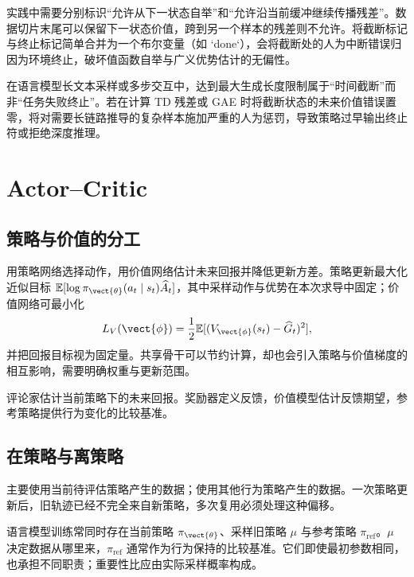 \documentclass[../textbook.tex]{subfiles}
\begin{document}
实践中需要分别标识“允许从下一状态自举”和“允许沿当前缓冲继续传播残差”。数据切片末尾可以保留下一状态价值，跨到另一个样本的残差则不允许。将截断标记与终止标记简单合并为一个布尔变量（如 `done`），会将截断处的人为中断错误归因为环境终止，破坏值函数自举与广义优势估计的无偏性。


\begin{warning}[人为截断与环境终止的混淆陷阱]
在语言模型长文本采样或多步交互中，达到最大生成长度限制属于“时间截断”而非“任务失败终止”。若在计算 TD 残差或 GAE 时将截断状态的未来价值错误置零，将对需要长链路推导的复杂样本施加严重的人为惩罚，导致策略过早输出终止符或拒绝深度推理。
\end{warning}

\section{Actor--Critic}

\subsection{策略与价值的分工}
用策略网络选择动作，用价值网络估计未来回报并降低更新方差。策略更新最大化近似目标 $\mathbb E[\log\pi_{\vect{\theta}}(a_t\mid s_t)\widehat A_t]$，其中采样动作与优势在本次求导中固定；价值网络可最小化
\begin{equation}
 L_V(\vect{\phi})=\frac12\mathbb E[(V_{\vect{\phi}}(s_t)-\widehat G_t)^2],
\end{equation}
并把回报目标视为固定量。共享骨干可以节约计算，却也会引入策略与价值梯度的相互影响，需要明确权重与更新范围。

评论家估计当前策略下的未来回报。奖励器定义反馈，价值模型估计反馈期望，参考策略提供行为变化的比较基准。

\subsection{在策略与离策略}
主要使用当前待评估策略产生的数据；使用其他行为策略产生的数据。一次策略更新后，旧轨迹已经不完全来自新策略，多次复用必须处理这种偏移。

语言模型训练常同时存在当前策略 $\pi_{\vect{\theta}}$、采样旧策略 $\mu$ 与参考策略 $\pi_{\mathrm{ref}}$。$\mu$ 决定数据从哪里来，$\pi_{\mathrm{ref}}$ 通常作为行为保持的比较基准。它们即使最初参数相同，也承担不同职责；重要性比应由实际采样概率构成。
\end{document}

